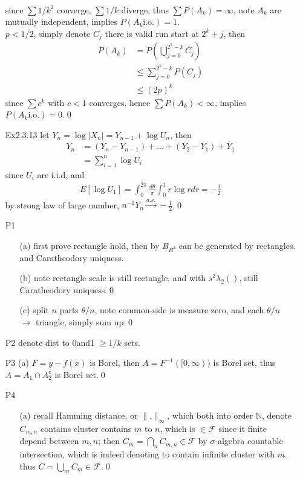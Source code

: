 \documentclass[paper=a4, fontsize=11pt]{scrartcl} %
\numberwithin{equation}{section} %
\numberwithin{figure}{section} %
\numberwithin{table}{section} %
\begin{document}
\begin{itemize}
\begin{align}
	\end{align}
	since $\sum 1/k^2$ converge, $\sum 1/k$ diverge, thus $\sum P(A_k)=\infty$, note $A_k$ are mutually independent, implies $P(A_k\text{i.o.})=1$.\\
	$p<1/2$, simply denote $C_j$ there is valid run start at $2^k+j$, then  
	\begin{align}
		P(A_k) &= P(\bigcup_{j=0}^{2^k-k} C_j) \\
			&\leq \sum_{j=0}^{2^k-k} P(C_j) \\
			&\leq (2p)^k
	\end{align}
	since $\sum c^k$ with $c<1$ converges, hence $\sum P(A_k)<\infty$, implies $P(A_k\text{i.o.})=0$.\qed
	\item[Ex2.3.13] let $Y_n = \log |X_n| = Y_{n-1}+ \log U_n$, then 
	\begin{align}
		Y_n &= (Y_n-Y_{n-1})+ \dots + (Y_2-Y_1) +Y_1 \\
			&= \sum_{i=1}^n \log U_i
	\end{align}
	since $U_i$ are i.i.d, and 
	\begin{align}
		E[\log U_1] = \int_0^{2\pi}\frac{d\theta}{\pi} \int_0^1 r\log r dr=-\frac{1}{2}
	\end{align}
	by strong law of large number, $n^{-1}Y_n \stackrel{a.s.}{\rightarrow} -\frac{1}{2}$.\qed
	\item[P1] 
	\begin{itemize}
		\item[(a)] first prove rectangle hold, then by $B_{R^2}$ can be generated by rectangles. and Caratheodory uniquess.
		\item[(b)] note rectangle scale is still rectangle, and with $s^2\lambda_2()$, still Caratheodory uniquess.\qed
		\item[(c)] split $n$ parts $\theta/n$, note common-side is measure zero, and each $\theta/n$ $\rightarrow$ triangle, simply sum up.\qed
	\end{itemize}
	\item[P2] denote dist to 0and1 $\geq 1/k$ sets.
	\item[P3](a) $F=y-f(x)$ is Borel, then $A= F^{-1}([0,\infty))$ is Borel set, thus $A=A_1\cap A_2^c$ is Borel set.\qed
	\item[P4]
	\begin{itemize}
		\item[(a)] recall Hamming distance, or $\|.\|_\infty$, which both into order $\mathbb{N}$, denote $C_{m,n}$ contains cluster contains $m$ to $n$, which is $\in \mathcal{F}$ since it finite depend between $m,n$; then $C_m=\bigcap_n C_{m,n}\in\mathcal{F}$ by $\sigma$-algebra countable intersection, which is indeed denoting to contain infinite cluster with $m$. thus $C=\bigcup_m C_m\in\mathcal{F}$.\qed

\end{itemize}
\end{itemize}
\end{document}
